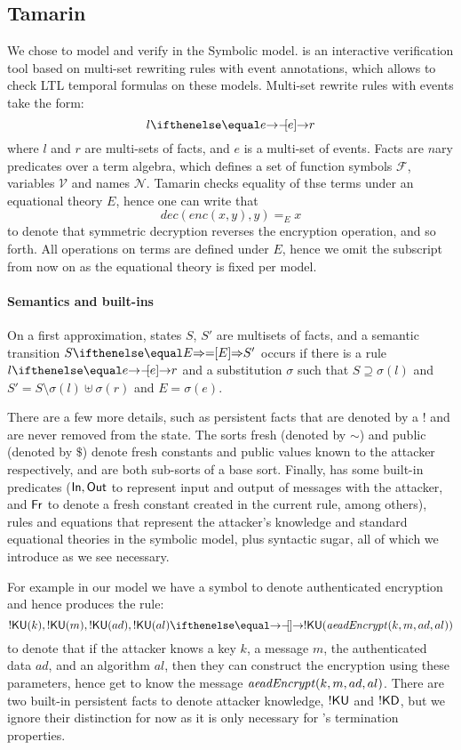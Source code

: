 \subsection{Tamarin}
We chose \mTamarin to model and verify \mEdhoc in the Symbolic model.
%
\mTamarin is an interactive verification tool based on multi-set rewriting rules
with event annotations, which allows to check LTL temporal formulas on these
models.
%
Multi-set rewrite rules with events take the form:
%
\[ l \ifarrow[e] r \]
%
where $l$ and $r$ are multi-sets of facts, and $e$ is a multi-set of events.
%
Facts are $n$ary predicates over a term algebra, which defines a set of function
symbols $\mathcal F$, variables $\mathcal V$ and names $\mathcal N$. Tamarin
checks equality of thse terms under an equational theory $E$, hence one can
write that
%
\[ dec(enc(x,y),y) =_E x \]
%
to denote that symmetric decryption reverses the encryption operation, and so
forth. All operations on terms are defined under $E$, hence we omit the
subscript from now on as the equational theory is fixed per model.

\paragraph{Semantics and built-ins} On a first approximation, \mTamarin states
$S$, $S'$ are multisets of facts, and a semantic transition $S \semarrow[E] S'$
occurs if there is a rule $l \ifarrow[e] r$ and a substitution $\sigma$ such
that $S \supseteq \sigma(l)$ and $S' = S \setminus \sigma(l) \uplus \sigma(r)$
and $E = \sigma(e)$.

There are a few more details, such as persistent facts that are denoted by a $!$
and are never removed from the state.
%
The sorts fresh (denoted by $\sim$) and public (denoted by $\$$) denote fresh
constants and public values known to the attacker respectively, and are both
sub-sorts of a base sort.
%
Finally, \mTamarin has some built-in predicates ($\mathsf{In},
\mathsf{Out}$ to represent input and output of messages with the attacker,
and
$\mathsf{Fr}$ to denote a fresh constant created in the current rule, among
others), rules and equations that represent the attacker's knowledge
and standard equational theories in the symbolic model, plus syntactic
sugar, all of which we introduce as we see necessary.

For example in our model we have a symbol to denote authenticated encryption and
hence \mTamarin produces the rule:
%
\[ !\mKU( k ), !\mKU( m ), !\mKU( ad ), !\mKU( al ) \ifarrow !\mKU( \mAeadEncrypt(k, m, ad, al) ) \]
%
to denote that if the attacker knows a key $k$, a message
$m$, the authenticated data $ad$, and an algorithm
$al$, then they can construct the encryption using these parameters, hence get
to know the message $\mathit{aeadEncrypt}(k, m, ad, al)$.
%
There are two built-in persistent facts to denote attacker knowledge,
$!\mathsf{KU}$ and
$!\mathsf{KD}$, but we ignore their distinction for now as it is only necessary for
\mTamarin's termination properties.

